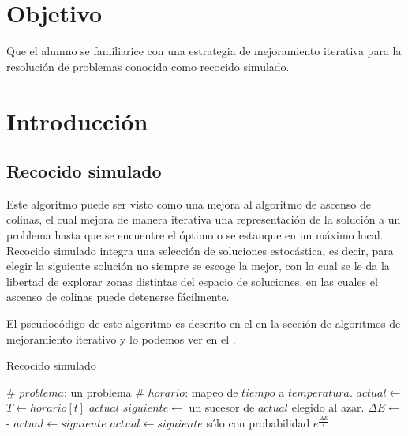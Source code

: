 \section{Objetivo}

Que el alumno se familiarice con una estrategia de mejoramiento iterativa para la resolución de problemas conocida como recocido simulado.



\section{Introducción}

\subsection{Recocido simulado}

Este algoritmo puede ser visto como una mejora al algoritmo de ascenso de colinas, el cual mejora de manera iterativa una representación de la solución a un problema hasta que se encuentre el óptimo o se estanque en un máximo local.  Recocido simulado integra una selección de soluciones estocástica, es decir, para elegir la siguiente solución no siempre se escoge la mejor, con la cual se le da la libertad de explorar zonas distintas del espacio de soluciones, en las cuales el ascenso de colinas puede detenerse fácilmente.

El pseudocódigo de este algoritmo es descrito en el \cite{Russell2010} en la sección de algoritmos de mejoramiento iterativo y lo podemos ver en el .

\begin{algorithm}
 \caption{Recocido simulado}\label{alg:annealing}
 \begin{algorithmic}
    \State \# $problema$: un problema
    \State \# $horario$: mapeo de $tiempo$ a $temperatura$.
    \State $actual \leftarrow $ 
      \State $T \leftarrow horario[t]$
       \Return $actual$ \EndIf
      \State $siguiente \leftarrow$ un sucesor de $actual$ elegido al azar.
      \State $\Delta E \leftarrow$  - 
        \State $actual \leftarrow siguiente$
      \Else
        \State $actual \leftarrow siguiente$ sólo con probabilidad $e^{\frac{\Delta E}{T}}$
      \EndIf
    \EndFor
  \EndFunction
 \end{algorithmic}
\end{algorithm}




